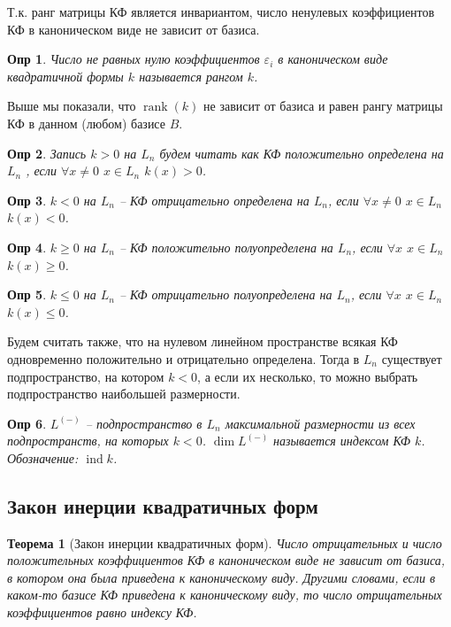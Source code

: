 \documentclass[a4paper,12pt]{article}
\DeclareMathOperator{\rank}{\mathop{rank}}
\DeclareMathOperator{\ind}{\mathop{ind}}
\newtheorem*{definition}{Опр}
\newtheorem{theorem}{Теорема}[section]
\begin{document}
Т.к. ранг матрицы КФ является инвариантом, число ненулевых коэффициентов КФ в каноническом виде не зависит от базиса.

\begin{definition}
	Число не равных нулю коэффициентов $\varepsilon_i$ в каноническом виде квадратичной формы $k$ называется рангом $k$.
\end{definition}

Выше мы показали, что $\rank(k)$ не зависит от базиса и равен рангу матрицы КФ в данном (любом) базисе $B$. 

\begin{definition}
	Запись $k > 0$ на $L_n$ будем читать как КФ положительно определена на $L_n$ , если $\forall x \ne 0$ $x \in L_n$  $k(x) > 0$.
\end{definition}

\begin{definition}
	$k < 0$ на $L_n$ -- КФ отрицательно определена на $L_n$, если $\forall x \ne 0$ $x \in L_n$  $k(x) < 0$.
\end{definition}

\begin{definition}
	$k \ge 0$ на $L_n$ -- КФ положительно полуопределена на $L_n$, если $\forall x$ $x \in L_n$  $k(x) \ge 0$.
\end{definition}

\begin{definition}
	$k \le 0$ на $L_n$ -- КФ отрицательно полуопределена на $L_n$, если $\forall x$ $x \in L_n$  $k(x) \le 0$.
\end{definition}

Будем считать также, что на нулевом линейном пространстве всякая КФ одновременно положительно и отрицательно определена. Тогда в $L_n$ существует подпространство, на котором  $k < 0$, а если их несколько, то можно выбрать подпространство наибольшей размерности.

\begin{definition}
	$L^{(-)}$ -- подпространство в $L_n$ максимальной размерности из всех подпространств, на которых $k < 0$. $\dim L^{(-)}$ называется индексом КФ $k$. Обозначение: $\ind{k}$.
\end{definition}

\subsection{Закон инерции квадратичных форм}

\begin{theorem}[Закон инерции квадратичных форм]
	Число отрицательных и число положительных коэффициентов КФ в каноническом виде не зависит от базиса, в котором она была приведена к каноническому виду. Другими словами, если в каком-то базисе КФ приведена к каноническому виду, то число отрицательных коэффициентов равно индексу КФ.
\end{theorem}
\end{document}
